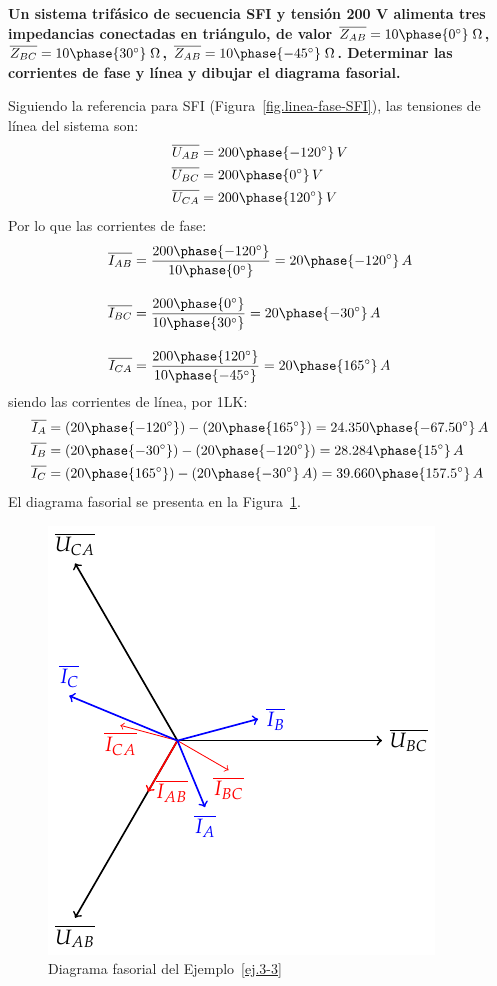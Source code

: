 \documentclass[11pt]{book} %
\begin{document}
	\vspace{4mm}
	\begin{example}\label{ej.3-3}
	    \textbf{Un sistema trifásico de secuencia SFI y tensión 200 V alimenta tres impedancias conectadas en triángulo, de valor $\overline{Z_{AB}}=10\phase{0^\circ}\;\Omega$, $\overline{Z_{BC}}=10\phase{30^\circ}\;\Omega$, $\overline{Z_{AB}}=10\phase{-45^\circ}\;\Omega$. Determinar las corrientes de fase y línea y dibujar el diagrama fasorial.}
	    
	    Siguiendo la referencia para SFI (Figura~\ref{fig.linea-fase-SFI}), las tensiones de línea del sistema son:
	    \begin{align*}
	        \overline{U_{AB}}&=200\phase{-120^\circ}\,V\\
	        \overline{U_{BC}}&=200\phase{0^\circ}\,V\\
	        \overline{U_{CA}}&=200\phase{120^\circ}\,V
	    \end{align*}
	    Por lo que las corrientes de fase:
	    \begin{align*}
	        \overline{I_{AB}} &= \frac{200\phase{-120^\circ}}{10\phase{0^\circ}} =20\phase{-120^\circ} \,A \\[10pt]
          \overline{I_{BC}} &= \frac{200\phase{0^\circ}}{10\phase{30^\circ}} = 20\phase{-30^\circ} \,A\\[10pt]
          \overline{I_{CA}} &=\frac{200\phase{120^\circ}}{10\phase{-45^\circ}} = 20\phase{165^\circ} \,A
	    \end{align*}
	    siendo las corrientes de línea, por 1LK:
	    \begin{align*}
	     \overline{I_A}&=(20\phase{-120^\circ})-(20\phase{165^\circ})=24.350\phase{-67.50^\circ}\,A\\	        \overline{I_B}&=(20\phase{-30^\circ})-(20\phase{-120^\circ})=28.284\phase{15^\circ}\,A\\
	    \overline{I_C}&=(20\phase{165^\circ})-(20\phase{-30^\circ} \,A)=39.660\phase{157.5^\circ}\,A
	    \end{align*}
	    El diagrama fasorial se presenta en la Figura~\ref{fig.diagrama_ejemplo_3-3}. 
	    \begin{figure}[H]
	        \centering
	        \includegraphics[width=0.35\linewidth]{../figs/diagrama_3_3.pdf}
	        \caption{Diagrama fasorial del Ejemplo~\ref{ej.3-3}}
	       \label{fig.diagrama_ejemplo_3-3}
	    \end{figure}
	\end{example}
	
\end{document}
